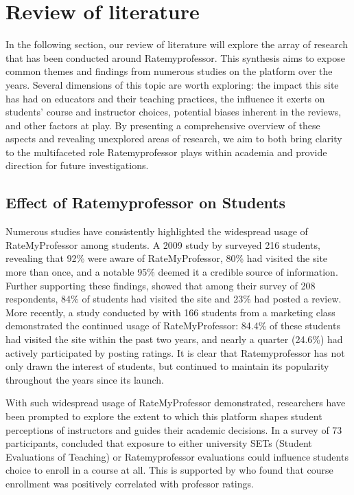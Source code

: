 \documentclass[doc,12pt, twocolumn]{apa7}
\begin{document}
\section{Review of literature}
In the following section, our review of literature will explore the array of research that has been conducted around Ratemyprofessor. This synthesis aims to expose common themes and findings from numerous studies on the platform over the years. Several dimensions of this topic are worth exploring: the impact this site has had on educators and their teaching practices, the influence it exerts on students' course and instructor choices, potential biases inherent in the reviews, and other factors at play. By presenting a comprehensive overview of these aspects and revealing unexplored areas of research, we aim to both bring clarity to the multifaceted role Ratemyprofessor plays within academia and provide direction for future investigations.

\subsection{Effect of Ratemyprofessor on Students}
Numerous studies have consistently highlighted the widespread usage of RateMyProfessor among students. A 2009 study by \textcite{davison_how_2009} surveyed 216 students, revealing that 92\% were aware of RateMyProfessor, 80\% had visited the site more than once, and a notable 95\% deemed it a credible source of information. Further supporting these findings, \textcite{bleske-rechek_ratemyprofessors_2010} showed that among their survey of 208 respondents, 84\% of students had visited the site and 23\% had posted a review. More recently, a study conducted by \textcite{chiang_students_2017} with 166 students from a marketing class demonstrated the continued usage of RateMyProfessor: 84.4\% of these students had visited the site within the past two years, and nearly a quarter (24.6\%) had actively participated by posting ratings. It is clear that Ratemyprofessor has not only drawn the interest of students, but continued to maintain its popularity throughout the years since its launch.

With such widespread usage of RateMyProfessor demonstrated, researchers have been prompted to explore the extent to which this platform shapes student perceptions of instructors and guides their academic decisions. In a survey of 73 participants, \textcite{boswell_effects_2020} concluded that exposure to either university SETs (Student Evaluations of Teaching) or Ratemyprofessor evaluations could influence students choice to enroll in a course at all. This is supported by \textcite{johnson_i_2014} who found that course enrollment was positively correlated with professor ratings.
\end{document}
